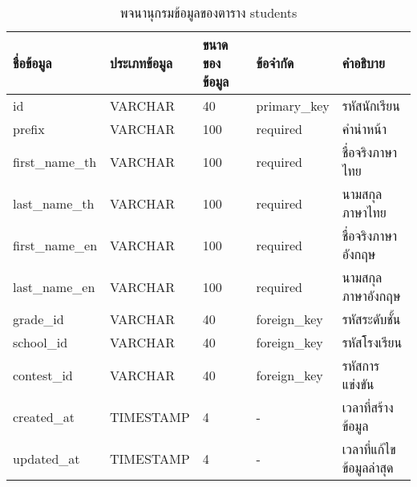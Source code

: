 \begin{table}[H]
    \caption{พจนานุกรมข้อมูลของตาราง students}
    \label{tab:database-students}
    \begin{tabularx}{\textwidth}{ | p{2.25cm} | p{2.20cm} | p{2.45cm} | p{2cm} | X | }
    \hline
    \textbf{ชื่อข้อมูล} & \textbf{ประเภทข้อมูล} & \textbf{ขนาดของข้อมูล} & \textbf{ข้อจำกัด} & \textbf{คำอธิบาย} \\
    \hline
    id & VARCHAR & 40 & primary\_key & รหัสนักเรียน \\
    \hline
    prefix & VARCHAR & 100 & required & คำนำหน้า \\
    \hline
    first\_name\_th & VARCHAR & 100 & required & ชื่อจริงภาษาไทย \\
    \hline
    last\_name\_th & VARCHAR & 100 & required & นามสกุลภาษาไทย \\
    \hline
    first\_name\_en & VARCHAR & 100 & required & ชื่อจริงภาษาอังกฤษ \\
    \hline
    last\_name\_en & VARCHAR & 100 & required & นามสกุลภาษาอังกฤษ \\
    \hline
    grade\_id & VARCHAR & 40 & foreign\_key & รหัสระดับชั้น \\
    \hline
    school\_id & VARCHAR & 40 & foreign\_key & รหัสโรงเรียน \\
    \hline
    contest\_id & VARCHAR & 40 & foreign\_key & รหัสการแข่งขัน \\
    \hline
    created\_at & TIMESTAMP & 4 & - & เวลาที่สร้างข้อมูล \\
    \hline
    updated\_at & TIMESTAMP & 4 & - & เวลาที่แก้ไขข้อมูลล่าสุด \\
    \hline
    \end{tabularx}
\end{table}

